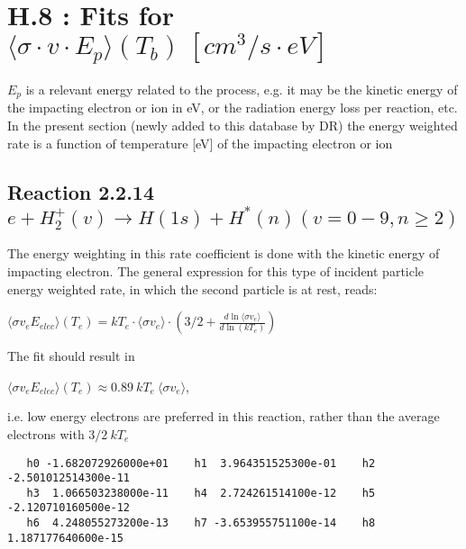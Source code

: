 \documentclass[12pt,dvipdfm]{article}
\begin{document}
\section{H.8 : Fits for $\langle\sigma \cdot v \cdot E_p \rangle (T_b) \ [cm^3/s
\cdot eV]$}

$E_p$ is a relevant energy related to the process, e.g. it may be the kinetic energy of the impacting electron or ion in eV,
or the radiation energy loss per reaction, etc.
In the present section (newly added to this database by DR)
the energy weighted rate is a function of temperature [eV] of the
impacting electron or ion

\subsection{
Reaction 2.2.14   $e + H_2^+(v) \rightarrow H(1s) + H^*(n)   (v=0-9, n \ge 2) $
}
The energy weighting in this rate coefficient is done with the kinetic energy of
impacting electron. The general expression for this type of incident particle energy weighted
rate, in which the second particle is at rest, reads:

$\langle\sigma v_e E_{elec}\rangle(T_e) = kT_e \cdot \langle\sigma v_e\rangle \cdot
\left(3/2 + \frac{d \ln \langle\sigma v_e\rangle}{d \ln(kT_e)}\right)$

The fit should result in

$\langle\sigma v_e E_{elec}\rangle(T_e) \approx 0.89 ~kT_e ~\langle\sigma v_e\rangle$,

i.e. low energy electrons are preferred in this reaction, rather than the average electrons with $3/2~kT_e$


\begin{small}\begin{verbatim}
   h0 -1.682072926000e+01    h1  3.964351525300e-01    h2 -2.501012514300e-11
   h3  1.066503238000e-11    h4  2.724261514100e-12    h5 -2.120710160500e-12
   h6  4.248055273200e-13    h7 -3.653955751100e-14    h8  1.187177640600e-15

\end{verbatim}\end{small}
\newpage
\end{document}
